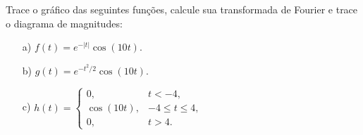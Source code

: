 \begin{Exercise} Trace o gráfico das seguintes funções, calcule sua transformada de Fourier e trace o diagrama de magnitudes: 
\begin{itemize}
\item[a)] $f(t)=e^{-|t|}\cos(10t)$.
\item[b)] $g(t)=e^{-t^2/2}\cos(10t)$.
\item[c)] $h(t)=\left\{
\begin{array}{ll}
0, &t<-4,\\
\cos(10t), &-4\leq t \leq 4,\\
0,&t>4.
\end{array} \right.$
\end{itemize}
\end{Exercise}

%